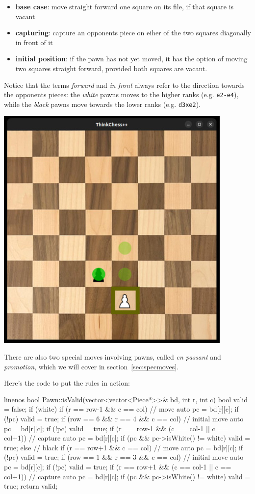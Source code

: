 \begin{itemize}
  \item \textbf{base case}: move straight forward one square on its file, if that square is vacant
  \item \textbf{capturing}: capture an opponents piece on eiher of the two squares diagonally
    in front of it
  \item \textbf{initial position}: if the pawn has not yet moved, it has the option of moving two
    squares straight forward, provided both squares are vacant.
\end{itemize}

Notice that the terms \emph{forward} and \emph{in front} always refer to the direction towards
the opponents pieces: the \emph{white} pawns moves to the higher ranks (e.g. \texttt{e2-e4}),
while the \emph{black} pawns move towards the lower ranks (e.g. \texttt{d3xe2}).

\begin{center}
\includegraphics[width=.5\linewidth]{img/pawn.jpg}
\end{center}

There are also two special moves involving pawns, called \emph{en passant} and \emph{promotion},
which we will cover in section~\ref{sec:specmoves}.

Here's the code to put the rules in action:

\begin{cpp*}{linenos}
bool Pawn::isValid(vector<vector<Piece*>>& bd, int r, int c) {
  bool valid = false;
  if (white) {
    if (r == row-1 && c == col) { // move
      auto pc = bd[r][c];
      if (!pc) valid = true;
    }
    if (row == 6 && r == 4 && c == col) { // initial move
      auto pc = bd[r][c];
      if (!pc) valid = true;
    }
    if (r == row-1 && (c == col-1 || c == col+1)) { // capture
      auto pc = bd[r][c];
      if (pc && pc->isWhite() != white) valid = true;
    }
  } else { // black
    if (r == row+1 && c == col) { // move
      auto pc = bd[r][c];
      if (!pc) valid = true;
    }
    if (row == 1 && r == 3 && c == col) { // initial move
      auto pc = bd[r][c];
      if (!pc) valid = true;
    }
    if (r == row+1 && (c == col-1 || c == col+1)) { // capture
      auto pc = bd[r][c];
      if (pc && pc->isWhite() != white) valid = true;
    }
  }
  return valid;
}
\end{cpp*}

